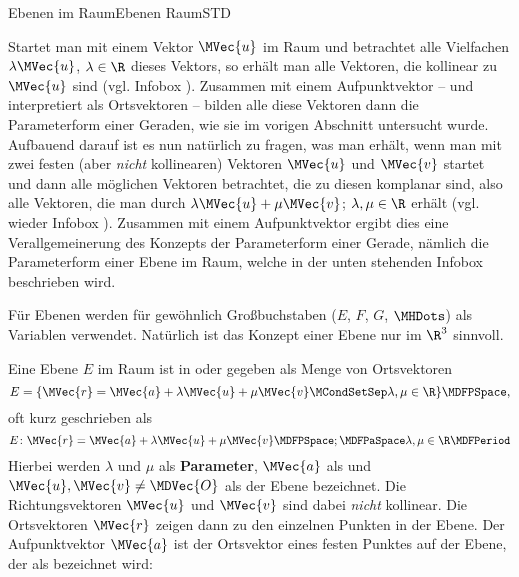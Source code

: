 \begin{MXContent}{Ebenen im Raum}{Ebenen Raum}{STD}

Startet man mit einem Vektor $\MVec{u}$ im Raum und betrachtet alle Vielfachen $\lambda\MVec{u}$, $\lambda\in\R$ dieses Vektors, so erhält man alle Vektoren, die kollinear zu $\MVec{u}$ sind (vgl. Infobox ). Zusammen mit einem Aufpunktvektor -- und interpretiert als Ortsvektoren -- bilden alle diese Vektoren dann die Parameterform einer Geraden, wie sie im vorigen Abschnitt  untersucht wurde. Aufbauend darauf ist es nun natürlich zu fragen, was man erhält, wenn man mit zwei festen (aber \textit{nicht} kollinearen) Vektoren $\MVec{u}$ und $\MVec{v}$ startet und dann alle möglichen Vektoren betrachtet, die zu diesen komplanar sind, also alle Vektoren, die man durch $\lambda\MVec{u}+\mu\MVec{v}$; $\lambda,\mu\in\R$ erhält (vgl. wieder Infobox ). Zusammen mit einem Aufpunktvektor ergibt dies eine Verallgemeinerung des Konzepts der Parameterform einer Gerade, nämlich die Parameterform einer Ebene im Raum, welche in der unten 
stehenden Infobox 
beschrieben wird.  

Für Ebenen werden für gewöhnlich Großbuchstaben ($E$, $F$, $G$, $\MHDots$) als Variablen verwendet. Natürlich ist das Konzept einer Ebene nur im $\R^3$ sinnvoll.

\begin{MInfo}
Eine Ebene $E$ im Raum ist in  oder  gegeben als Menge von Ortsvektoren
\[
 E=\{\MVec{r}=\MVec{a}+\lambda\MVec{u}+\mu\MVec{v}\MCondSetSep \lambda,\mu\in\R\} \MDFPSpace ,
\]
oft kurz geschrieben als
\[
 E\colon\MVec{r}=\MVec{a}+\lambda\MVec{u}+\mu\MVec{v}\MDFPSpace;\MDFPaSpace \lambda,\mu\in\R \MDFPeriod
\]
Hierbei werden $\lambda$ und $\mu$ als \textbf{Parameter}, $\MVec{a}$ als  und $\MVec{u},\MVec{v}\neq\MDVec{O}$ als  der Ebene bezeichnet. Die Richtungsvektoren $\MVec{u}$ und $\MVec{v}$ sind dabei \textit{nicht} kollinear. Die Ortsvektoren $\MVec{r}$ zeigen dann zu den einzelnen Punkten in der Ebene. Der Aufpunktvektor $\MVec{a}$ ist der Ortsvektor eines festen Punktes auf der Ebene, der als  bezeichnet wird:


\end{MInfo}
\end{MXContent}
